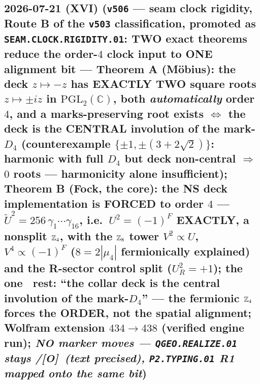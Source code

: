 \documentclass[11pt]{article}
\providecommand{\mO}{\textbf{[O]}}\providecommand{\mX}{\textbf{[X]}}
\begin{document}
\subsection*{2026-07-21 (XVI) (\texttt{v506} --- seam clock rigidity, Route B of the \texttt{v503} classification, promoted as \texttt{SEAM.CLOCK.RIGIDITY.01}: TWO exact theorems reduce the order-$4$ clock input to ONE alignment bit --- Theorem A (M\"obius): the deck $z\mapsto-z$ has EXACTLY TWO square roots $z\mapsto\pm iz$ in $\mathrm{PGL}_2(\mathbb C)$, both \emph{automatically} order $4$, and a marks-preserving root exists $\iff$ the deck is the CENTRAL involution of the mark-$D_4$ (counterexample $\{\pm1,\pm(3{+}2\sqrt2)\}$: harmonic with full $D_4$ but deck non-central $\Rightarrow$ $0$ roots --- harmonicity alone insufficient); Theorem B (Fock, the core): the NS deck implementation is FORCED to order $4$ --- $\tilde U^2=256\,\gamma_1\cdots\gamma_{16}$, i.e.\ $U^2=(-1)^F$ EXACTLY, a nonsplit $\mathbb{Z}_4$, with the $\mathbb{Z}_8$ tower $V^2\propto U$, $V^4\propto(-1)^F$ ($8=2|\mu_4|$ fermionically explained) and the R-sector control split ($U_R^2=+1$); the one \mC\ rest: ``the collar deck is the central involution of the mark-$D_4$'' --- the fermionic $\mathbb{Z}_4$ forces the ORDER, not the spatial alignment; Wolfram extension $434\to438$ (verified engine run); \emph{NO marker moves --- \texttt{QGEO.REALIZE.01} stays \mC/\mO\ (text precised), \texttt{P2.TYPING.01} R1 mapped onto the same bit})}
\end{document}
